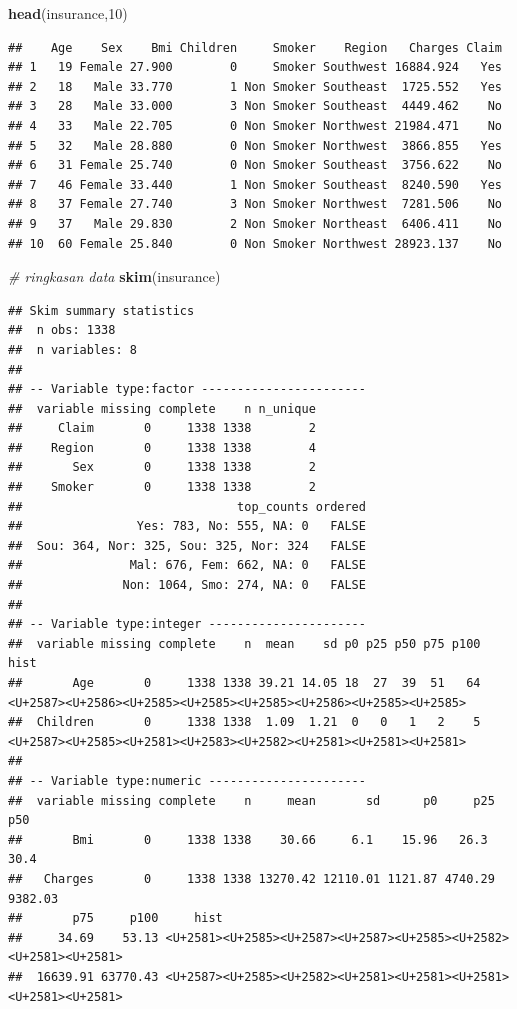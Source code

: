 \documentclass[]{article}
\newenvironment{Shaded}{\begin{snugshade}}{\end{snugshade}}
\newcommand{\CommentTok}[1]{\textcolor[rgb]{0.56,0.35,0.01}{\textit{#1}}}
\newcommand{\DecValTok}[1]{\textcolor[rgb]{0.00,0.00,0.81}{#1}}
\newcommand{\KeywordTok}[1]{\textcolor[rgb]{0.13,0.29,0.53}{\textbf{#1}}}
\newcommand{\NormalTok}[1]{#1}
\begin{document}
\begin{Shaded}
\begin{Highlighting}[]
\KeywordTok{head}\NormalTok{(insurance,}\DecValTok{10}\NormalTok{)}
\end{Highlighting}
\end{Shaded}

\begin{verbatim}
##    Age    Sex    Bmi Children     Smoker    Region   Charges Claim
## 1   19 Female 27.900        0     Smoker Southwest 16884.924   Yes
## 2   18   Male 33.770        1 Non Smoker Southeast  1725.552   Yes
## 3   28   Male 33.000        3 Non Smoker Southeast  4449.462    No
## 4   33   Male 22.705        0 Non Smoker Northwest 21984.471    No
## 5   32   Male 28.880        0 Non Smoker Northwest  3866.855   Yes
## 6   31 Female 25.740        0 Non Smoker Southeast  3756.622    No
## 7   46 Female 33.440        1 Non Smoker Southeast  8240.590   Yes
## 8   37 Female 27.740        3 Non Smoker Northwest  7281.506    No
## 9   37   Male 29.830        2 Non Smoker Northeast  6406.411    No
## 10  60 Female 25.840        0 Non Smoker Northwest 28923.137    No
\end{verbatim}

\begin{Shaded}
\begin{Highlighting}[]
\CommentTok{# ringkasan data}
\KeywordTok{skim}\NormalTok{(insurance)}
\end{Highlighting}
\end{Shaded}

\begin{verbatim}
## Skim summary statistics
##  n obs: 1338 
##  n variables: 8 
## 
## -- Variable type:factor -----------------------
##  variable missing complete    n n_unique
##     Claim       0     1338 1338        2
##    Region       0     1338 1338        4
##       Sex       0     1338 1338        2
##    Smoker       0     1338 1338        2
##                              top_counts ordered
##                Yes: 783, No: 555, NA: 0   FALSE
##  Sou: 364, Nor: 325, Sou: 325, Nor: 324   FALSE
##               Mal: 676, Fem: 662, NA: 0   FALSE
##              Non: 1064, Smo: 274, NA: 0   FALSE
## 
## -- Variable type:integer ----------------------
##  variable missing complete    n  mean    sd p0 p25 p50 p75 p100     hist
##       Age       0     1338 1338 39.21 14.05 18  27  39  51   64 <U+2587><U+2586><U+2585><U+2585><U+2585><U+2586><U+2585><U+2585>
##  Children       0     1338 1338  1.09  1.21  0   0   1   2    5 <U+2587><U+2585><U+2581><U+2583><U+2582><U+2581><U+2581><U+2581>
## 
## -- Variable type:numeric ----------------------
##  variable missing complete    n     mean       sd      p0     p25     p50
##       Bmi       0     1338 1338    30.66     6.1    15.96   26.3    30.4 
##   Charges       0     1338 1338 13270.42 12110.01 1121.87 4740.29 9382.03
##       p75     p100     hist
##     34.69    53.13 <U+2581><U+2585><U+2587><U+2587><U+2585><U+2582><U+2581><U+2581>
##  16639.91 63770.43 <U+2587><U+2585><U+2582><U+2581><U+2581><U+2581><U+2581><U+2581>
\end{verbatim}
\end{document}
